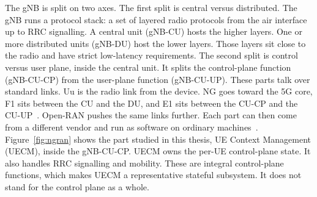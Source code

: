 \documentclass[english,oneside,a4paper,censored,csm,software-track-2020]{HYthesisML}
\begin{document}
The gNB is split on two axes. The first split is central versus distributed.
The gNB runs a protocol stack: a set of layered radio protocols from the air
interface up to RRC signalling. A central unit (gNB-CU) hosts the higher layers.
One or more distributed units (gNB-DU) host the lower layers. Those layers sit close to
the radio and have strict low-latency requirements. The second split is control versus user
plane, inside the central unit. It splits the control-plane function
(gNB-CU-CP) from the user-plane function (gNB-CU-UP). These parts talk over
standard links. Uu is the radio link from the device. NG goes toward the 5G core, F1 sits between the CU and the DU,
and E1 sits between the CU-CP and the CU-UP~\cite{3gpp38401,3gpp38300,3gpp38463}.
Open-RAN pushes the same links further. Each part can then come from a
different vendor and run as software on ordinary
machines~\cite{polese2023oran}. Figure~\ref{fig:ngran} shows the part studied in this thesis, UE Context Management (UECM), inside the gNB-CU-CP. UECM owns the per-UE
control-plane state. It also handles RRC signalling and mobility. These are
integral control-plane functions, which makes UECM a representative stateful
subsystem. It does not stand for the control plane as a whole.
\end{document}
